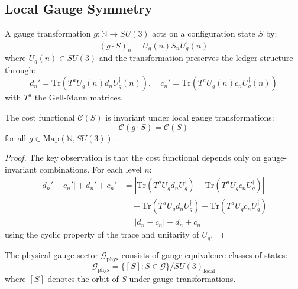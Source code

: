 \subsection{Local Gauge Symmetry}

\begin{definition}
A gauge transformation $g: \mathbb{N} \to SU(3)$ acts on a configuration state $S$ by:
\begin{equation}
(g \cdot S)_n = U_g(n) S_n U_g^\dagger(n)
\end{equation}
where $U_g(n) \in SU(3)$ and the transformation preserves the ledger structure through:
\begin{equation}
d_n' = \text{Tr}(T^a U_g(n) d_n U_g^\dagger(n)), \quad c_n' = \text{Tr}(T^a U_g(n) c_n U_g^\dagger(n))
\end{equation}
with $T^a$ the Gell-Mann matrices.
\end{definition}

\begin{lemma}
The cost functional $\mathcal{C}(S)$ is invariant under local gauge transformations:
\begin{equation}
\mathcal{C}(g \cdot S) = \mathcal{C}(S)
\end{equation}
for all $g \in \text{Map}(\mathbb{N}, SU(3))$.
\end{lemma}

\begin{proof}
The key observation is that the cost functional depends only on gauge-invariant combinations. For each level $n$:
\begin{align}
|d_n' - c_n'| + d_n' + c_n' &= |\text{Tr}(T^a U_g d_n U_g^\dagger) - \text{Tr}(T^a U_g c_n U_g^\dagger)| \\
&\quad + \text{Tr}(T^a U_g d_n U_g^\dagger) + \text{Tr}(T^a U_g c_n U_g^\dagger) \\
&= |d_n - c_n| + d_n + c_n
\end{align}
using the cyclic property of the trace and unitarity of $U_g$.
\end{proof}

\begin{definition}
The physical gauge sector $\mathcal{G}_{\text{phys}}$ consists of gauge-equivalence classes of states:
\begin{equation}
\mathcal{G}_{\text{phys}} = \{[S] : S \in \mathcal{G}\} / SU(3)_{\text{local}}
\end{equation}
where $[S]$ denotes the orbit of $S$ under gauge transformations.
\end{definition}


